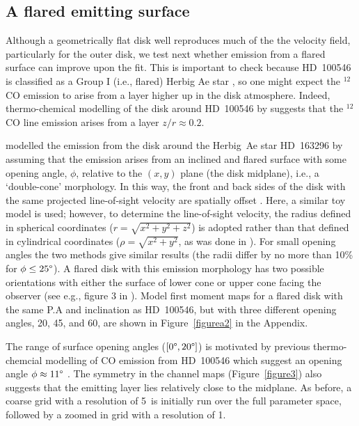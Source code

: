\documentclass[onecolumn]{aastex6}
\begin{document}
\subsection{A flared emitting surface}

Although a geometrically flat disk well reproduces much of the
the velocity field, particularly for the outer disk,
we test next whether emission from a flared surface can improve upon the fit.
This is important to check because HD~100546 is classified as a Group I (i.e., flared)
Herbig Ae star \citep{meeus01}, so one might expect the $^{12}$CO emission to arise from a layer
higher up in the disk atmosphere.
Indeed, thermo-chemical modelling of the disk around HD~100546 by \citet{bruderer12}
suggests that the $^{12}$CO line emission arises from a layer $z/r \approx 0.2$.

\citet{rosenfeld13} modelled the emission from the disk around
the Herbig~Ae star HD~163296 by assuming that the emission arises from
an inclined and flared surface with some opening angle, $\phi$, relative
to the $(x,y)$ plane (the disk midplane), i.e., a `double-cone' morphology.
In this way, the front and back sides of the disk with the same projected
line-of-sight velocity are spatially offset \citep[see also][]{degregorio13}.
Here, a similar toy model is used; however, to determine the
line-of-sight velocity, the radius defined in spherical coordinates
($r=\sqrt{x^2+y^2+z^2}$) is adopted rather than that defined in cylindrical coordinates
($\rho=\sqrt{x^2+y^2}$, as was done in \citealt{rosenfeld13}).
For small opening angles the two methods give similar results
(the radii differ by no more than 10\% for $\phi \le 25\degree$).
A flared disk with this emission morphology has two possible orientations with either
the surface of lower cone or upper cone facing the observer
(see e.g., figure 3 in \citealt{rosenfeld13}).
Model first moment maps for a flared disk with the same P.A and inclination as
HD~100546, but with three different opening angles, 20\degree, 45\degree, and
60\degree, are shown in Figure~\ref{figurea2} in the Appendix.

The range of surface opening angles ($[0\degree,20\degree]$) is motivated by
previous thermo-chemcial
modelling of CO emission from HD~100546
which suggest an opening angle $\phi \approx 11\degree$ \citep[][]{bruderer12}.
The symmetry in the channel maps (Figure~\ref{figure3}) also suggests that the emitting layer
lies relatively close to the midplane.
As before, a coarse grid with a resolution of 5\degree~is initially
run over the full parameter space, followed by a zoomed in grid
with a resolution of 1\degree.
\end{document}
